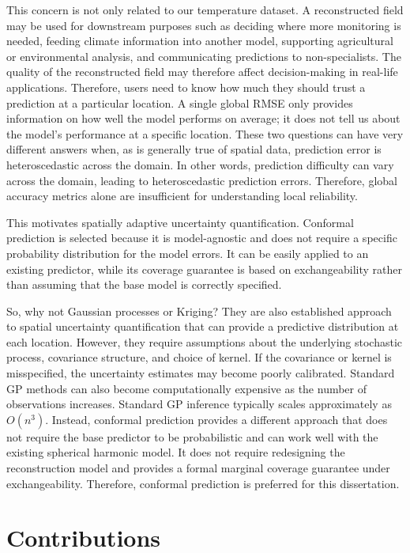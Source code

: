 This concern is not only related to our temperature dataset. A reconstructed field may be used for downstream purposes such as deciding where more monitoring is needed, feeding climate information into another model, supporting agricultural or environmental analysis, and communicating predictions to non-specialists. The quality of the reconstructed field may therefore affect decision-making in real-life applications. Therefore, users need to know how much they should trust a prediction at a particular location. A single global RMSE only provides information on how well the model performs on average; it does not tell us about the model's performance at a specific location. These two questions can have very different answers when, as is generally true of spatial data, prediction error is heteroscedastic across the domain. In other words, prediction difficulty can vary across the domain, leading to heteroscedastic prediction errors. Therefore, global accuracy metrics alone are insufficient for understanding local reliability.

This motivates spatially adaptive uncertainty quantification. Conformal prediction is selected because it is model-agnostic and does not require a specific probability distribution for the model errors. It can be easily applied to an existing predictor, while its coverage guarantee is based on exchangeability rather than assuming that the base model is correctly specified.

So, why not Gaussian processes or Kriging? They are also established approach to spatial uncertainty quantification that can provide a predictive distribution at each location. However, they require assumptions about the underlying stochastic process, covariance structure, and choice of kernel. If the covariance or kernel is misspecified, the uncertainty estimates may become poorly calibrated. Standard GP methods can also become computationally expensive as the number of observations increases. Standard GP inference typically scales approximately as $O(n^3)$. Instead, conformal prediction provides a different approach that does not require the base predictor to be probabilistic and can work well with the existing spherical harmonic model. It does not require redesigning the reconstruction model and provides a formal marginal coverage guarantee under exchangeability. Therefore, conformal prediction is preferred for this dissertation.

\section{Contributions}

